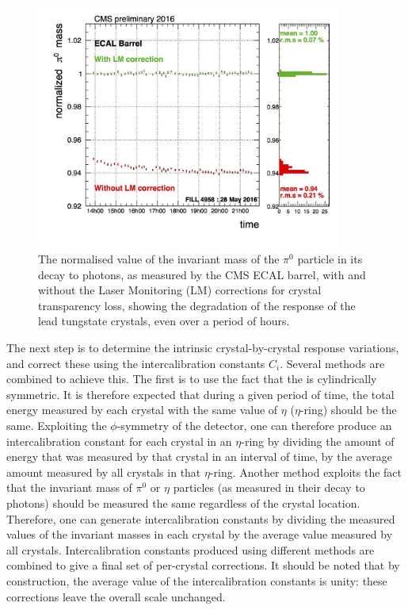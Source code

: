 \begin{figure}[h]
\centering
\includegraphics[width=0.9\textwidth]{detectorFigures/pi0_EB_plus_1.jpg}
\caption{The normalised value of the invariant mass of the $\pi^0$ particle in its decay to photons, as measured by the CMS ECAL barrel, with and without the Laser Monitoring (LM) corrections for crystal transparency loss, showing the degradation of the response of the lead tungstate crystals, even over a period of hours. \cite{CMSECALPublic}}
\label{fig:cms:ecal:pizeroLMcorr}
\end{figure}

The next step is to determine the intrinsic crystal-by-crystal response variations, and correct these using the intercalibration constants $C_{i}$. Several methods are combined to achieve this. The first is to use the fact that the \CMS \ECAL is cylindrically symmetric. It is therefore expected that during a given period of time, the total energy measured by each crystal with the same value of $\eta$ ($\eta$-ring) should be the same. Exploiting the $\phi$-symmetry of the detector, one can therefore produce an intercalibration constant for each crystal in an $\eta$-ring by dividing the amount of energy that was measured by that crystal in an interval of time, by the average amount measured by all crystals in that $\eta$-ring. Another method exploits the fact that the invariant mass of $\pi^0$ or $\eta$ particles (as measured in their decay to photons) should be measured the same regardless of the crystal location. Therefore, one can generate intercalibration constants by dividing the measured values of the invariant masses in each crystal by the average value measured by all crystals. Intercalibration constants produced using different methods are combined to give a final set of per-crystal corrections. It should be noted that by construction, the average value of the intercalibration constants is unity: these corrections leave the overall scale unchanged.

